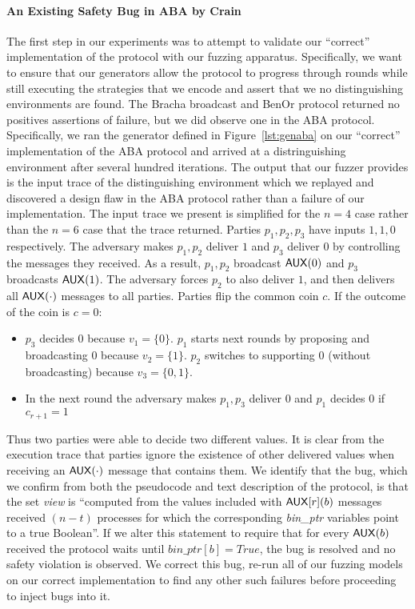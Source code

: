 \paragraph{An Existing Safety Bug in ABA by Crain~\cite{aba}}
The first step in our experiments was to attempt to validate our ``correct'' implementation of the protocol with our fuzzing apparatus. 
Specifically, we want to ensure that our generators allow the protocol to progress through rounds while still executing the strategies that we encode and assert that we no distinguishing environments are found.
The Bracha broadcast and BenOr protocol returned no positives assertions of failure, but we did observe one in the ABA protocol. 
Specifically, we ran the generator defined in Figure~\ref{lst:genaba} on our ``correct'' implementation of the ABA protocol and arrived at a distringuishing environment after several hundred iterations.
The output that our fuzzer provides is the input trace of the distinguishing environment which we replayed and discovered a design flaw in the ABA protocol rather than a failure of our implementation.
The input trace we present is simplified for the $n=4$ case rather than the $n=6$ case that the trace returned.
Parties $p_1, p_2, p_3$ have inputs $1, 1, 0$ respectively.
The adversary makes $p_1, p_2$ deliver $1$ and $p_3$ deliver $0$ by controlling the  messages they received.
As a result, $p_1, p_2$ broadcast ${\mathsf {AUX}}(0)$ and $p_3$ broadcasts ${\mathsf {AUX}}(1)$. 
The adversary forces $p_2$ to also deliver $1$, and then delivers all ${\mathsf {AUX}}(\cdot)$ messages to all parties.
Parties flip the common coin $c$. If the outcome of the coin is $c=0$:
\begin{itemize}
\item $p_3$ decides $0$ because $v_1 = \{0\}$. $p_1$ starts next rounds by proposing and broadcasting $0$ because $v_2 = \{1\}$. $p_2$ switches to supporting $0$ (without broadcasting) because $v_3 = \{0,1\}$. 
\item In the next round the adversary makes $p_1,p_3$ deliver $0$ and $p_1$ decides $0$ if $c_{r+1} = 1$ %
\end{itemize}
Thus two parties were able to decide two different values.
It is clear from the execution trace that parties ignore the existence of other delivered values when receiving an ${\mathsf {AUX}}(\cdot)$ message that contains them.
We identify that the bug, which we confirm from both the pseudocode and text description of the protocol, is that the set \emph{view} is ``computed from the values included with ${\mathsf {AUX}}[r](b)$ messages received $(n-t)$ processes for which the corresponding \emph{bin\_ptr} variables point to a true Boolean''.
If we alter this statement to require that for every ${\mathsf {AUX}}(b)$ received the protocol waits until $bin\_ptr[b] = True$, the bug is resolved and no safety violation is observed.
We correct this bug, re-run all of our fuzzing models on our correct implementation to find any other such failures before proceeding to inject bugs into it.

